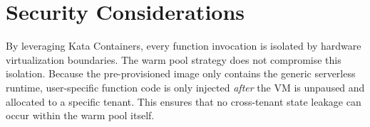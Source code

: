 \section{Security Considerations}
By leveraging Kata Containers, every function invocation is isolated by hardware virtualization boundaries. The warm pool strategy does not compromise this isolation. Because the pre-provisioned image only contains the generic serverless runtime, user-specific function code is only injected \textit{after} the VM is unpaused and allocated to a specific tenant. This ensures that no cross-tenant state leakage can occur within the warm pool itself.

\vspace{2cm}
\lipsum[41-60] %
